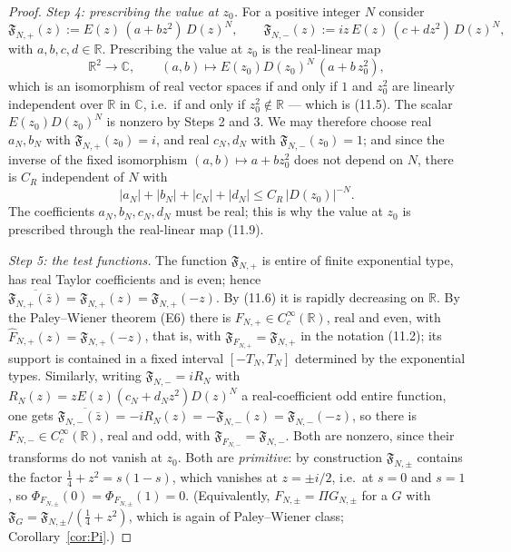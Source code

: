 \documentclass[11pt]{amsart}
\theoremstyle{definition}
\theoremstyle{remark}
\newcommand{\C}{\mathbb C}
\newcommand{\R}{\mathbb R}
\begin{document}
\begin{proof}
\emph{Step 4: prescribing the value at $z_0$.}  For a
positive integer $N$ consider
\begin{equation}
  \mathfrak F_{N,+}(z):=E(z)\,(a+bz^2)\,D(z)^N,
  \qquad
  \mathfrak F_{N,-}(z):=iz\,E(z)\,(c+dz^2)\,D(z)^N,
\tag{11.8}
\end{equation}
with $a,b,c,d\in\R$.  Prescribing the value at $z_0$ is the real-linear map
\begin{equation}
  \R^2\to\C,\qquad (a,b)\longmapsto E(z_0)D(z_0)^N\,(a+b\,z_0^2),
\tag{11.9}
\end{equation}
which is an isomorphism of real vector spaces if and only if $1$ and $z_0^2$
are linearly independent over $\R$ in $\C$, i.e.\ if and only if
$z_0^2\notin\R$ --- which is (11.5).  The scalar $E(z_0)D(z_0)^N$ is nonzero by
Steps 2 and 3.  We may therefore choose real $a_N,b_N$ with
$\mathfrak F_{N,+}(z_0)=i$, and real $c_N,d_N$ with
$\mathfrak F_{N,-}(z_0)=1$; and since the inverse of the fixed isomorphism
$(a,b)\mapsto a+bz_0^2$ does not depend on $N$, there is $C_R$ independent of
$N$ with
\begin{equation}
  |a_N|+|b_N|+|c_N|+|d_N|\le C_R\,|D(z_0)|^{-N}.
\tag{11.10}
\end{equation}
The coefficients $a_N,b_N,c_N,d_N$ must be real; this is why the value at $z_0$
is prescribed through the real-linear map (11.9).

\emph{Step 5: the test functions.}  The function $\mathfrak F_{N,+}$ is entire
of finite exponential type, has real Taylor coefficients and is even; hence
$\overline{\mathfrak F_{N,+}(\bar z)}=\mathfrak F_{N,+}(z)
=\mathfrak F_{N,+}(-z)$.  By (11.6) it is rapidly decreasing on $\R$.  By the
Paley--Wiener theorem (E6) there is $F_{N,+}\in C_c^\infty(\R)$, real and even,
with $\hat F_{N,+}(z)=\mathfrak F_{N,+}(-z)$, that is, with
$\mathfrak F_{F_{N,+}}=\mathfrak F_{N,+}$ in the notation (11.2); its support
is contained in a fixed interval $[-T_N,T_N]$ determined by the exponential
types.  Similarly, writing $\mathfrak F_{N,-}=iR_N$ with
$R_N(z)=zE(z)(c_N+d_Nz^2)D(z)^N$ a real-coefficient odd entire function, one
gets $\overline{\mathfrak F_{N,-}(\bar z)}=-iR_N(z)=-\mathfrak F_{N,-}(z)
=\mathfrak F_{N,-}(-z)$, so there is $F_{N,-}\in C_c^\infty(\R)$, real and odd,
with $\mathfrak F_{F_{N,-}}=\mathfrak F_{N,-}$.  Both are nonzero, since their
transforms do not vanish at $z_0$.  Both are \emph{primitive}: by construction
$\mathfrak F_{N,\pm}$ contains the factor $\tfrac14+z^2=s(1-s)$, which vanishes
at $z=\pm i/2$, i.e.\ at $s=0$ and $s=1$, so
$\Phi_{F_{N,\pm}}(0)=\Phi_{F_{N,\pm}}(1)=0$.  (Equivalently, $F_{N,\pm}=\Pi
G_{N,\pm}$ for a $G$ with $\mathfrak F_{G}=\mathfrak F_{N,\pm}/(\tfrac14+z^2)$,
which is again of Paley--Wiener class; Corollary~\ref{cor:Pi}.)


\end{proof}
\end{document}
